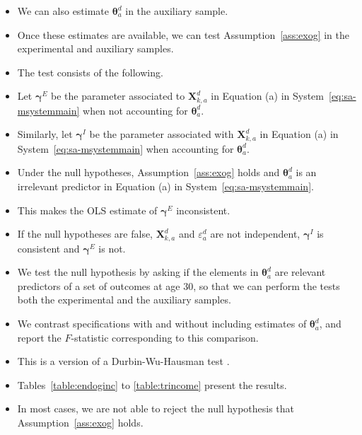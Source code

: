 \documentclass[static]{JJH-Beamer}
\begin{document}
\begin{frame}
 \addtocounter{framenumber}{-1}

\begin{itemize}
\item We can also estimate $\bm{\theta}_{a}^d$ in the auxiliary sample.
\item Once these estimates are available, we can test Assumption~\ref{ass:exog} in the experimental and auxiliary samples.
\item The test consists of the following.
\item Let $\bm{\gamma}^E$ be the parameter associated to $\bm{X}^d_{k,a}$ in Equation (a) in System~\eqref{eq:sa-msystemmain} when not accounting for $\bm{\theta}_{a}^d$.
\item Similarly, let $\bm{\gamma}^I$ be the parameter associated with $\bm{X}^d_{k,a}$ in Equation (a) in System~\eqref{eq:sa-msystemmain} when accounting for $\bm{\theta}_{a}^d$.
\item Under the null hypotheses, Assumption~\ref{ass:exog} holds and $\bm{\theta}_{a}^d$ is an irrelevant predictor in Equation (a) in System~\eqref{eq:sa-msystemmain}.
\item This makes the OLS estimate of $\bm{\gamma}^E$ inconsistent.
\end{itemize}

\end{frame}

\begin{frame}
 \addtocounter{framenumber}{-1}

\begin{itemize}
\item If the null hypotheses are false, $\bm{X}^d_{k,a}$ and $\varepsilon_{a}^d$ are not independent, $\bm{\gamma}^I$ is consistent and $\bm{\gamma}^E$ is not.
\item We test the null hypothesis by asking if the elements in $\bm{\theta}_{a}^d$ are relevant predictors of a set of outcomes at age 30, so that we can perform the tests both the experimental and the auxiliary samples.
\item We contrast specifications with and without including estimates of $\bm{\theta}_{a}^d$, and report the $F$-statistic corresponding to this comparison.
\item This is a version of a Durbin-Wu-Hausman test \citep[see][]{Durbin_1954_RISI,Wu_1973_Econometrica,Hausman_1978_Econometrica}.
\item Tables~\ref{table:endoginc} to \ref{table:trincome} present the results.
\item In most cases, we are not able to reject the null hypothesis that Assumption~\ref{ass:exog} holds.
\end{itemize}

\end{frame}
\end{document}
